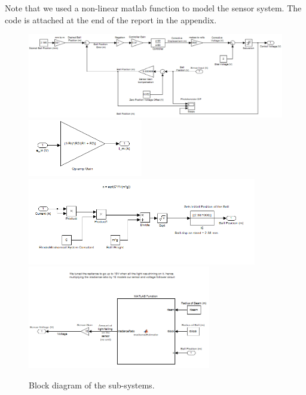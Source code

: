 \documentclass{article}
\theoremstyle{plain}
\theoremstyle{definition}
\theoremstyle{remark}
\begin{document}
Note that we used a non-linear matlab function to model the sensor system. The code is attached at the end of the report in the appendix.

\begin{figure}[h]
\begin{center}
\includegraphics[width=15cm]{Computer.png}
\includegraphics[width=5cm]{OpAmp.png}
\includegraphics[width=10cm]{Actuator_Ball.png}
\includegraphics[width=8cm]{Sensor.png}
\end{center}
\caption{Block diagram of the sub-systems.}
\label{q1_a2}
\end{figure}
\end{document}
